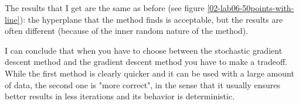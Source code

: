     The results that I get are the same as before (see figure \ref{02-lab06-50points-with-line}): the hyperplane that the method finds is acceptable, but the results are often different (because of the inner random nature of the method).\par
    I can conclude that when you have to choose between the stochastic gradient descent method and the gradient descent method you have to make a tradeoff. While the first method is clearly quicker and it can be used with a large amount of data, the second one is "more correct", in the sense that it usually ensures better results in less iterations and its behavior is deterministic.